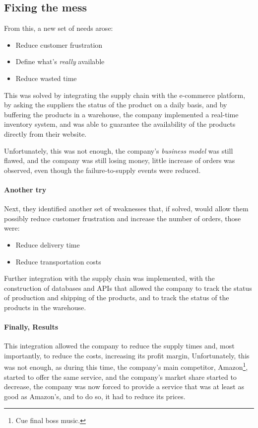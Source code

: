 \documentclass[openright, twoside, twocolumn, a4paper, 10pt]{report}
\begin{document}
\subsection{Fixing the mess}

From this, a new set of needs arose:

\begin{itemize}
	\item Reduce customer frustration
	\item Define what's \emph{really} available
	\item Reduce wasted time
\end{itemize}

This was solved by integrating the supply chain with the e-commerce platform, by asking the suppliers the status of the product on a daily basis, and by
buffering the products in a warehouse, the company implemented a real-time inventory system, and was able to guarantee the availability of the products
directly from their website.

Unfortunately, this was not enough, the company's \emph{business model} was still flawed, and the company was still losing money, little
increase of orders was observed, even though the failure-to-supply events were reduced.

\paragraph{Another try}

Next, they identified another set of weaknesses that, if solved, would allow them possibly reduce customer frustration and increase the number of orders, those were:

\begin{itemize}
	\item Reduce delivery time
	\item Reduce transportation costs
\end{itemize}

Further integration with the supply chain was implemented, with the construction of databases and APIs that allowed the company to track the status of production
and shipping of the products, and to track the status of the products in the warehouse.

\paragraph{Finally, Results}

This integration allowed the company to reduce the supply times and, most importantly, to reduce the costs, increasing its profit margin, Unfortunately, this was not enough,
as during this time, the company's main competitor, Amazon\footnote{
	Cue final boss music.
}, started to offer the same service, and the company's market share started to decrease, the company was now forced to provide a service that was
at least as good as Amazon's, and to do so, it had to reduce its prices.
\end{document}
